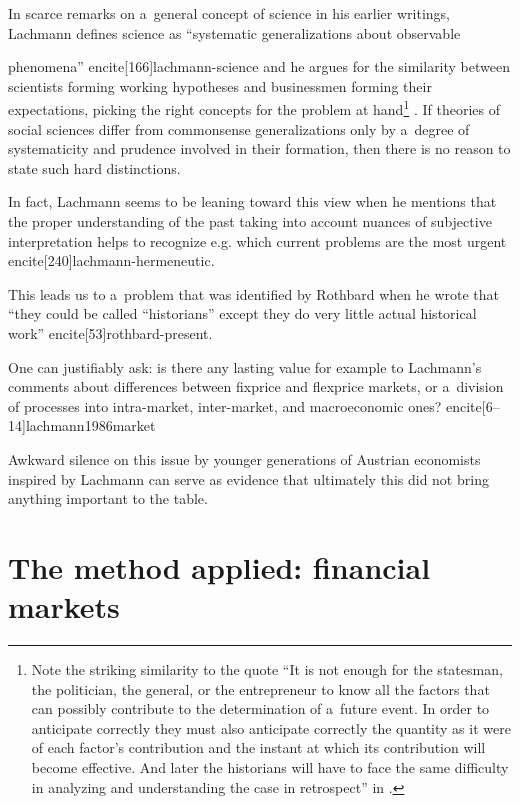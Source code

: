 {In scarce remarks on a~general concept of science in his earlier writings, Lachmann defines science as ``systematic generalizations about observable

phenomena'' encite[166]{lachmann-science} and he argues for the similarity between scientists forming working hypotheses and businessmen forming their expectations, picking the right concepts for the problem at hand\footnote{Note the striking similarity to the quote ``It is not enough for the statesman, the politician, the general, or the entrepreneur to know all the factors that can possibly contribute to the determination of a~future event. In order to anticipate correctly they must also anticipate correctly the quantity as it were of each factor's contribution and the instant at which its contribution will become effective. And later the historians will have to face the same difficulty in analyzing and understanding the case in retrospect'' in \textcite[314--315]{mises-theory}.} \cite[90, 93]{lachmann-shackle-time}. If theories of social sciences differ from commonsense generalizations only by a~degree of systematicity and prudence involved in their formation, then there is no reason to state such hard distinctions.

In fact, Lachmann seems to be leaning toward this view when he mentions that the proper understanding of the past taking into account nuances of subjective interpretation helps to recognize e.g. which current problems are the most urgent encite[240]{lachmann-hermeneutic}.



This leads us to a~problem that was identified by Rothbard when he wrote that ``they could be called ``historians'' except they do very little actual historical work'' encite[53]{rothbard-present}.

One can justifiably ask: is there any lasting value for example to Lachmann's comments about differences between fixprice and flexprice markets, or a~division of processes into intra-market, inter-market, and macroeconomic ones? encite[6--14]{lachmann1986market}

Awkward silence on this issue by younger generations of Austrian economists inspired by Lachmann can serve as evidence that ultimately this did not bring anything important to the table.



\section{The method applied: financial markets}

}
